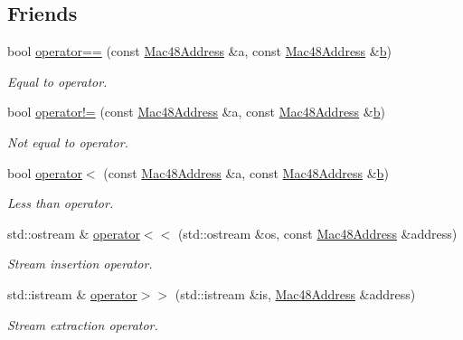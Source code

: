 \subsection*{Friends}
\begin{DoxyCompactItemize}
\item 
bool \hyperlink{classns3_1_1Mac48Address_aeb2a2d3c37ff2d0386c31db8fad7049b}{operator==} (const \hyperlink{classns3_1_1Mac48Address}{Mac48\+Address} \&a, const \hyperlink{classns3_1_1Mac48Address}{Mac48\+Address} \&\hyperlink{lte__pathloss_8m_a21ad0bd836b90d08f4cf640b4c298e7c}{b})
\begin{DoxyCompactList}\small\item\em Equal to operator. \end{DoxyCompactList}\item 
bool \hyperlink{classns3_1_1Mac48Address_a7fec81d7c48b61afc2680094af089200}{operator!=} (const \hyperlink{classns3_1_1Mac48Address}{Mac48\+Address} \&a, const \hyperlink{classns3_1_1Mac48Address}{Mac48\+Address} \&\hyperlink{lte__pathloss_8m_a21ad0bd836b90d08f4cf640b4c298e7c}{b})
\begin{DoxyCompactList}\small\item\em Not equal to operator. \end{DoxyCompactList}\item 
bool \hyperlink{classns3_1_1Mac48Address_a7f09c43c04821b0c7dc8eb09c7eff190}{operator$<$} (const \hyperlink{classns3_1_1Mac48Address}{Mac48\+Address} \&a, const \hyperlink{classns3_1_1Mac48Address}{Mac48\+Address} \&\hyperlink{lte__pathloss_8m_a21ad0bd836b90d08f4cf640b4c298e7c}{b})
\begin{DoxyCompactList}\small\item\em Less than operator. \end{DoxyCompactList}\item 
std\+::ostream \& \hyperlink{classns3_1_1Mac48Address_aca6af925b9cd65258357c69a52688825}{operator$<$$<$} (std\+::ostream \&os, const \hyperlink{classns3_1_1Mac48Address}{Mac48\+Address} \&address)
\begin{DoxyCompactList}\small\item\em Stream insertion operator. \end{DoxyCompactList}\item 
std\+::istream \& \hyperlink{classns3_1_1Mac48Address_a4b43000938f9da16d5262770166faf0a}{operator$>$$>$} (std\+::istream \&is, \hyperlink{classns3_1_1Mac48Address}{Mac48\+Address} \&address)
\begin{DoxyCompactList}\small\item\em Stream extraction operator. \end{DoxyCompactList}\end{DoxyCompactItemize}


